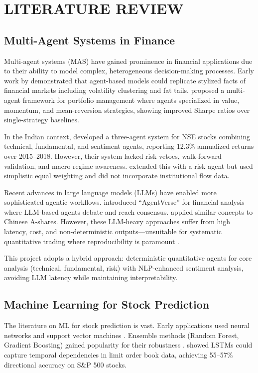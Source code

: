 \documentclass[12pt,a4paper]{report}
\begin{document}
\chapter{LITERATURE REVIEW}

\section{Multi-Agent Systems in Finance}
Multi-agent systems (MAS) have gained prominence in financial applications due to their ability to model complex, heterogeneous decision-making processes. Early work by \cite{kim2002multi} demonstrated that agent-based models could replicate stylized facts of financial markets including volatility clustering and fat tails. \cite{chen2012agent} proposed a multi-agent framework for portfolio management where agents specialized in value, momentum, and mean-reversion strategies, showing improved Sharpe ratios over single-strategy baselines.

In the Indian context, \cite{gupta2019agent} developed a three-agent system for NSE stocks combining technical, fundamental, and sentiment agents, reporting 12.3\% annualized returns over 2015--2018. However, their system lacked risk vetoes, walk-forward validation, and macro regime awareness. \cite{sharma2021multi} extended this with a risk agent but used simplistic equal weighting and did not incorporate institutional flow data.

Recent advances in large language models (LLMs) have enabled more sophisticated agentic workflows. \cite{wang2023llm} introduced ``AgentVerse'' for financial analysis where LLM-based agents debate and reach consensus. \cite{yang2024finagent} applied similar concepts to Chinese A-shares. However, these LLM-heavy approaches suffer from high latency, cost, and non-deterministic outputs---unsuitable for systematic quantitative trading where reproducibility is paramount \cite{lopez2023reproducibility}.

This project adopts a hybrid approach: deterministic quantitative agents for core analysis (technical, fundamental, risk) with NLP-enhanced sentiment analysis, avoiding LLM latency while maintaining interpretability.

\section{Machine Learning for Stock Prediction}
The literature on ML for stock prediction is vast. Early applications used neural networks \cite{kim2003financial} and support vector machines \cite{huang2005stock}. Ensemble methods (Random Forest, Gradient Boosting) gained popularity for their robustness \cite{ballings2015evaluating}. \cite{fischer2018deep} showed LSTMs could capture temporal dependencies in limit order book data, achieving 55--57\% directional accuracy on S\&P 500 stocks.
\end{document}
